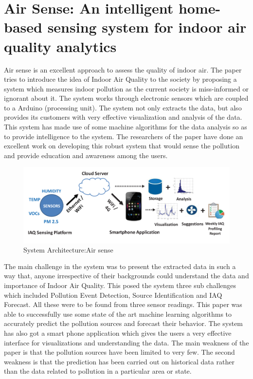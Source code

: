 \documentclass[10pt,a4paper]{report}
\begin{document}
\section{Air Sense: An intelligent home-based sensing system for indoor air quality analytics}

Air sense is an excellent approach to assess the quality of indoor air. The paper tries to introduce the idea of Indoor Air Quality to the society by proposing a system which measures indoor pollution as the current society is miss-informed or ignorant about it. The system works through electronic sensors which are coupled to a Arduino (processing unit). The system not only extracts the data, but also provides its customers with very effective visualization and analysis of the data. This system has made use of some machine algorithms for the data analysis so as to provide intelligence to the system. The researchers of the paper have done an excellent work on developing this robust system that would sense the pollution and provide education and awareness among the users.
\begin{figure}[h!]
  \centering
  \hspace*{-1.25cm}   
\includegraphics[scale=0.34]{images/fig2.png}
  \hspace*{-1.25cm}
  \caption{System Architecture:Air sense}
  \label{arch}
\end{figure}

The main challenge in the system was to present the extracted data in such a way that, anyone irrespective of their backgrounds could understand the data and importance of Indoor Air Quality. This posed the system three sub challenges which included Pollution Event Detection, Source Identification and IAQ Forecast. All these were to be found from three sensor readings. This paper was able to successfully use some state of the art machine learning algorithms to accurately predict the pollution sources and forecast their behavior. The system has also got a smart phone application which gives the users a very effective interface for visualizations and understanding the data.
The main weakness of the paper is that the pollution sources have been limited to very few. The second weakness is that the prediction has been carried out on historical data rather than the data related to pollution in a particular area or state.
\end{document}
